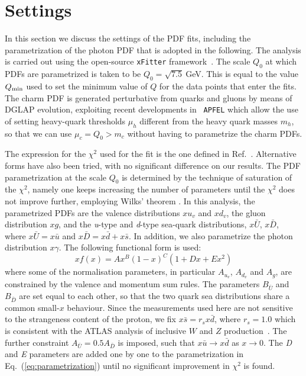 \section{Settings}
\label{sec:fitsettings}

In this section we discuss the settings of the PDF fits, including the
parametrization of the photon PDF that is adopted in the following.
%
The analysis is carried out using the open-source {\tt xFitter}
framework~\cite{Alekhin:2014irh}.
%
The scale $Q_0$ at which PDFs are parametrized is taken to be
$Q_0 = \sqrt{7.5}~$GeV.
%
This is equal to the value $Q_{\rm min}$ used to set the minimum value
of $Q$ for the data points that enter the fits.
%
The charm PDF is generated perturbative from quarks and gluons by
means of DGLAP evolution, exploiting recent developments in {\tt
  APFEL} which allow the use of setting heavy-quark thresholds $\mu_h$
different from the heavy quark masses $m_h$, so that we can use
$\mu_c=Q_0 > m_c$ without having to parametrize the charm PDFs.

The expression for the $\chi^2$ used for the fit is the one defined in
Ref.~\cite{Aaron:2009aa}.
%
Alternative forms have also been tried, with no significant difference
on our results.
% 
The PDF parametrization at the scale $Q_0$ is determined by the
technique of saturation of the $\chi^{2}$, namely one keeps increasing
the number of parameters until the $\chi^{2}$ does not improve
further, employing Wilks' theorem \cite{Wilks:1938dza}.
%
In this analysis, the parametrized PDFs are the valence distributions
$xu_{v}$ and $xd_{v}$, the gluon distribution $xg$, and the
\textit{u}-type and \textit{d}-type sea-quark distributions,
$x\bar{U}$, $x\bar{D}$, where $x\bar{U} = x\bar{u}$ and
$x\bar{D} = x\bar{d} + x\bar{s}$.
%
In addition, we also parametrize the photon distribution $x\gamma$.
%
The following functional form is used:
\begin{equation}
  \label{eq:parametrization}
xf(x) = Ax^{B}(1-x)^{C}(1+Dx+Ex^{2})
\end{equation}
where some of the normalisation parameters, in particular $A_{u_{v}}$,
$A_{d_{v}}$ and $A_{g}$, are constrained by the valence and momentum
sum rules.
%
The parameters $B_{\bar{U}}$ and $B_{\bar{D}}$ are set equal to each
other, so that the two quark sea distributions share a common
small-$x$ behaviour.
%
Since the measurements used here are not sensitive to the strangeness
content of the proton, we fix $x\bar{s} = r_sx\bar{d}$, where
$r_s=1.0$ which is consistent with the ATLAS analysis of inclusive $W$
and $Z$ production~\cite{Aad:2012sb,Aaboud:2016btc}.
%
The further constraint $A_{\bar{U}} = 0.5 A_{\bar{D}}$ is imposed,
such that $x\bar{u} \to x\bar{d}$ as $x \to 0$.  The \textit{D} and
\textit{E} parameters are added one by one to the parametrization in
Eq.~(\ref{eq:parametrization}) until no significant improvement in
$\chi^{2}$ is found.

